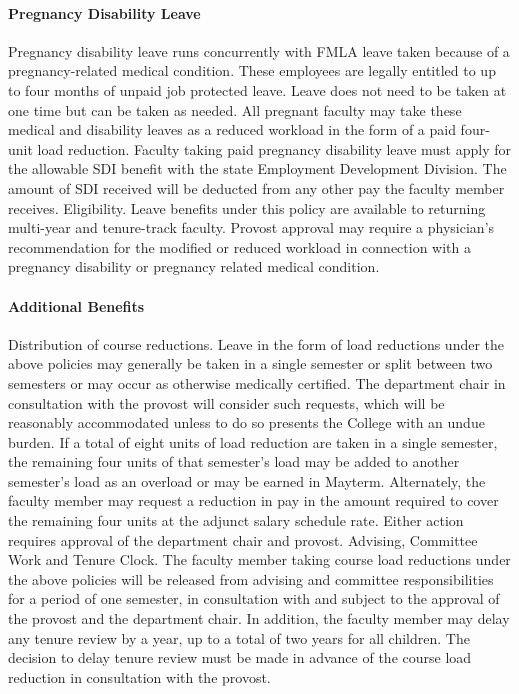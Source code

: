\documentclass[letterpaper, 11pt]{article}
\begin{document}
			\paragraph{Pregnancy Disability Leave}
				Pregnancy disability leave runs concurrently with FMLA leave taken because of a pregnancy-related medical condition. These employees are legally entitled to up to four months of unpaid job protected leave. Leave does not need to be taken at one time but can be taken as needed.
				All pregnant faculty may take these medical and disability leaves as a reduced workload in the form of a paid four-unit load reduction. Faculty taking paid pregnancy disability leave must apply for the allowable SDI benefit with the state Employment Development Division. The amount of SDI received will be deducted from any other pay the faculty member receives.
				Eligibility. Leave benefits under this policy are available to returning multi-year and tenure-track faculty. Provost approval may require a physician's recommendation for the modified or reduced workload in connection with a pregnancy disability or pregnancy related medical condition.

			\paragraph{Additional Benefits}
				Distribution of course reductions. Leave in the form of load reductions under the above policies may generally be taken in a single semester or split between two semesters or may occur as otherwise medically certified. The department chair in consultation with the provost will consider such requests, which will be reasonably accommodated unless to do so presents the College with an undue burden.
				If a total of eight units of load reduction are taken in a single semester, the remaining four units of that semester's load may be added to another semester's load as an overload or may be earned in Mayterm. Alternately, the faculty member may request a reduction in pay in the amount required to cover the remaining four units at the adjunct salary schedule rate. Either action requires approval of the department chair and provost.
				Advising, Committee Work and Tenure Clock.  The faculty member taking course load reductions under the above policies will be released from advising and committee responsibilities for a period of one semester, in consultation with and subject to the approval of the provost and the department chair. In addition, the faculty member may delay any tenure review by a year, up to a total of two years for all children.  The decision to delay tenure review must be made in advance of the course load reduction in consultation with the provost.
\end{document}
